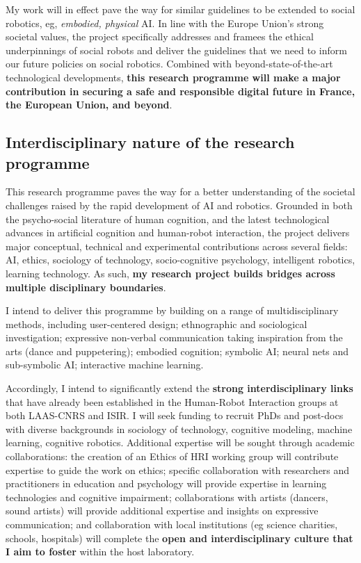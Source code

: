 My work will in effect pave the way for similar guidelines to be extended to
social robotics, eg, \emph{embodied, physical} AI. In line with the Europe
Union's strong societal values, the project specifically addresses and framees
the ethical underpinnings of social robots and deliver the guidelines that we
need to inform our future policies on social robotics. Combined with
beyond-state-of-the-art technological developments, \textbf{this research
programme will make a major contribution in securing a safe and responsible
digital future in France, the European Union, and beyond}. 


\subsection{Interdisciplinary nature of the research programme}

This research programme paves the way for a better understanding of the societal
challenges raised by the rapid development of AI and robotics. Grounded in both
the psycho-social literature of human cognition, and the latest technological
advances in artificial cognition and human-robot interaction, the project
delivers major conceptual, technical and experimental contributions across
several fields: AI, ethics, sociology of technology, socio-cognitive psychology,
intelligent robotics, learning technology. As such, \textbf{my research project
builds bridges across multiple disciplinary boundaries}.

I intend to deliver this programme by building on a range of multidisciplinary
methods, including user-centered design; ethnographic and sociological
investigation; expressive non-verbal communication taking inspiration from the
arts (dance and puppetering); embodied cognition; symbolic AI; neural nets and
sub-symbolic AI; interactive machine learning.

Accordingly, I intend to significantly extend the \textbf{strong
interdisciplinary links} that have already been established in the Human-Robot
Interaction groups at both LAAS-CNRS and ISIR. I will seek funding to recruit
PhDs and post-docs with diverse backgrounds in sociology of technology, cognitive
modeling, machine learning, cognitive robotics. Additional expertise will be
sought through academic collaborations: the creation of an Ethics of HRI working
group will contribute expertise to guide the work on ethics; specific
collaboration with researchers and practitioners in education and psychology
will provide expertise in learning technologies and cognitive impairment;
collaborations with artists (dancers, sound artists) will provide additional
expertise and insights on expressive communication; and collaboration with local
institutions (eg science charities, schools, hospitals) will complete the
\textbf{open and interdisciplinary culture that I aim to foster} within the
host laboratory.


